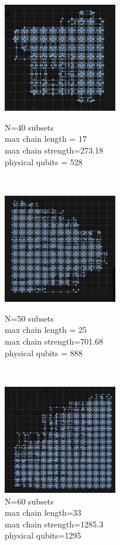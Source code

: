 \documentclass[oneside,a4paper]{article}
\begin{document}
\begin{figure}[htp]
\begin{minipage}[b]{4.5cm}
\centering
\includegraphics[width=5cm]{LaTeXTemplate/Images/2000QN40.png}
\caption{N=40 subsets\\max chain length = 17\\max chain strength=273.18\\physical qubits = 528}
\end{minipage}
\ \hspace{2mm} \hspace{2mm} \
\begin{minipage}[b]{4.5cm}
\centering
\includegraphics[width=5cm]{LaTeXTemplate/Images/2000QN50.png}
\caption{N=50 subsets\\max chain length = 25\\max chain strength=701.68\\physical qubits = 888}
\end{minipage}
\ \hspace{2mm} \hspace{2mm} \
\begin{minipage}[b]{4.5cm}
\centering
\includegraphics[width=5cm]{LaTeXTemplate/Images/2000QN60.png}
\caption{N=60 subsets\\max chain length=33\\max chain strength=1285.3\\physical qubits=1295}
\end{minipage}
\end{figure}
\end{document}
